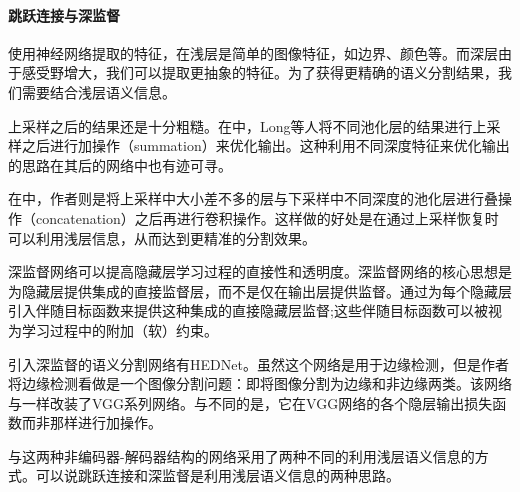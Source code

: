 \paragraph{跳跃连接与深监督}
使用神经网络提取的特征，在浅层是简单的图像特征，如边界、颜色等。而深层由于感受野增大，我们可以提取更抽象的特征。为了获得更精确的语义分割结果，我们需要结合浅层语义信息。

上采样之后的结果还是十分粗糙。在\cite{long2015fully}中，Long等人将不同池化层的结果进行上采样之后进行加操作（summation）来优化输出。这种利用不同深度特征来优化输出的思路在其后的网络中也有迹可寻。

在\cite{ronneberger2015u}中，作者则是将上采样中大小差不多的层与下采样中不同深度的池化层进行叠操作（concatenation）之后再进行卷积操作。这样做的好处是在通过上采样恢复时可以利用浅层信息，从而达到更精准的分割效果。

深监督网络\cite{lee2015deeply}可以提高隐藏层学习过程的直接性和透明度。深监督网络的核心思想是为隐藏层提供集成的直接监督层，而不是仅在输出层提供监督。通过为每个隐藏层引入伴随目标函数来提供这种集成的直接隐藏层监督;这些伴随目标函数可以被视为学习过程中的附加（软）约束。

引入深监督的语义分割网络有HEDNet\cite{xie2015holistically}。虽然这个网络是用于边缘检测，但是作者将边缘检测看做是一个图像分割问题：即将图像分割为边缘和非边缘两类。该网络与\cite{long2015fully}一样改装了VGG系列网络。与\cite{long2015fully}不同的是，它在VGG网络的各个隐层输出损失函数而非\cite{long2015fully}那样进行加操作。

\cite{lee2015deeply}与\cite{long2015fully}这两种非编码器-解码器结构的网络采用了两种不同的利用浅层语义信息的方式。可以说跳跃连接和深监督是利用浅层语义信息的两种思路。